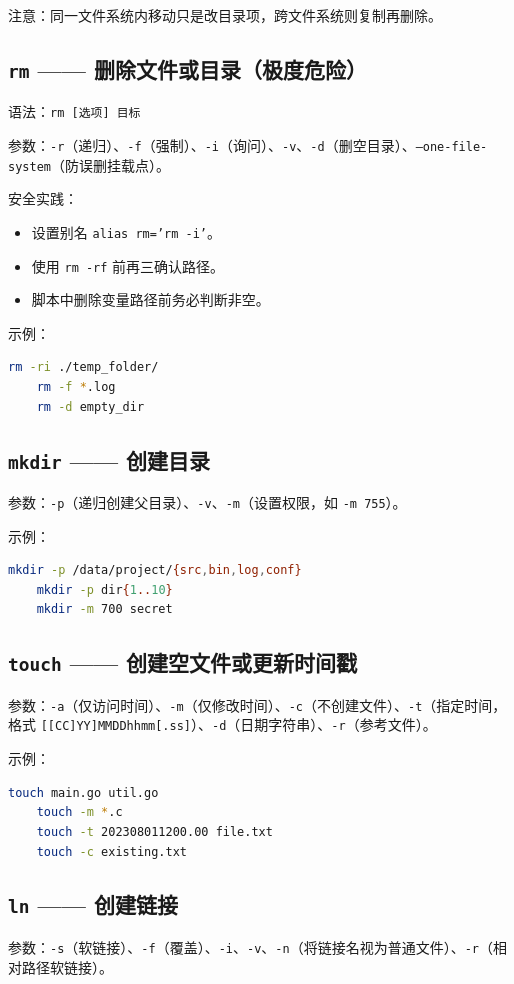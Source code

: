 注意：同一文件系统内移动只是改目录项，跨文件系统则复制再删除。

\subsection*{\texttt{rm} —— 删除文件或目录（极度危险）} 语法：\texttt{rm [选项] 目标}

参数：\texttt{-r}（递归）、\texttt{-f}（强制）、\texttt{-i}（询问）、\texttt{-v}、\texttt{-d}（删空目录）、\texttt{--one-file-system}（防误删挂载点）。

安全实践：
\begin{itemize}
\item 设置别名 \texttt{alias rm='rm -i'}。
\item 使用 \texttt{rm -rf} 前再三确认路径。
\item 脚本中删除变量路径前务必判断非空。
\end{itemize}

示例：
\begin{lstlisting}[language=bash]
	rm -ri ./temp_folder/
	rm -f *.log
	rm -d empty_dir
\end{lstlisting}

\subsection*{\texttt{mkdir} —— 创建目录} 参数：\texttt{-p}（递归创建父目录）、\texttt{-v}、\texttt{-m}（设置权限，如 \texttt{-m 755}）。

示例：
\begin{lstlisting}[language=bash]
	mkdir -p /data/project/{src,bin,log,conf}
	mkdir -p dir{1..10}
	mkdir -m 700 secret
\end{lstlisting}

\subsection*{\texttt{touch} —— 创建空文件或更新时间戳} 参数：\texttt{-a}（仅访问时间）、\texttt{-m}（仅修改时间）、\texttt{-c}（不创建文件）、\texttt{-t}（指定时间，格式 \texttt{[[CC]YY]MMDDhhmm[.ss]}）、\texttt{-d}（日期字符串）、\texttt{-r}（参考文件）。

示例：
\begin{lstlisting}[language=bash]
	touch main.go util.go
	touch -m *.c
	touch -t 202308011200.00 file.txt
	touch -c existing.txt
\end{lstlisting}

\subsection*{\texttt{ln} —— 创建链接}
参数：\texttt{-s}（软链接）、\texttt{-f}（覆盖）、\texttt{-i}、\texttt{-v}、\texttt{-n}（将链接名视为普通文件）、\texttt{-r}（相对路径软链接）。

